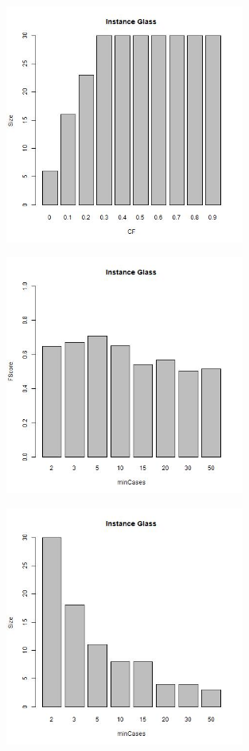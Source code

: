\documentclass[12pt,a4paper]{article}
\begin{document}
\begin{figure}[H]
\centering
\includegraphics[width=0.7\textwidth]{glassSizeCF.jpg}
\end{figure}

\begin{figure}[H]
\centering
\includegraphics[width=0.7\textwidth]{glassFScoreMinCases.jpg}
\end{figure}

\begin{figure}[H]
\centering
\includegraphics[width=0.7\textwidth]{glassSizeMinCases.jpg}
\end{figure}
\end{document}
